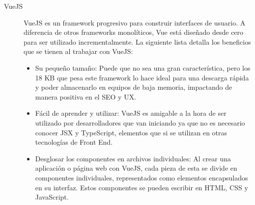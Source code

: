 \begin{description}
        \item[VueJS]  VueJS es un framework progresivo para construir interfaces de usuario. A diferencia de otros frameworks monolíticos, Vue está diseñado desde cero para ser utilizado incrementalmente.
        La siguiente lista detalla los beneficios que se tienen al trabajar con VueJS:
        
        \begin{itemize}
            \item Su pequeño tamaño: Puede que no sea una gran característica, pero los 18 KB que pesa este framework lo hace ideal para una descarga rápida y poder almacenarlo en equipos de baja memoria, impactando de manera positiva en el SEO y UX.
            \item Fácil de aprender y utilizar: VueJS es amigable a la hora de ser utilizado por desarrolladores que van iniciando ya que no es necesario conocer JSX y TypeScript, elementos que si se utilizan en otras tecnologías de Front End.
            \item Desglosar los componentes en archivos individuales: Al crear una aplicación o página web con VueJS, cada pieza de esta se divide en componentes individuales, representados como elementos encapsulados en su interfaz. Estos componentes se pueden escribir en HTML, CSS y JavaScript.
            
        \end{itemize}
    \end{description}


